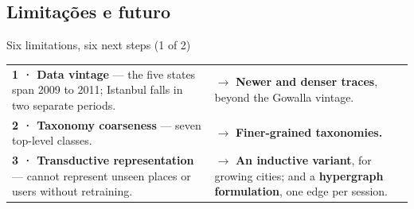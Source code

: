 \documentclass{beamer}
\begin{document}
\subsection{Limitações e futuro}

\begin{frame}{Six limitations, six next steps (1 of 2)}
    \vfill
    {\small
    \setlength{\tabcolsep}{6pt}
    \renewcommand{\arraystretch}{1.35}\begin{tabular}{@{}p{6.2cm} p{7.2cm}@{}}
        \toprule
        {\raggedright \textbf{1 · Data vintage} --- the five states span 2009 to 2011; Istanbul falls in two separate periods.\par}
            & {\raggedright $\rightarrow$ \textbf{Newer and denser traces}, beyond the Gowalla vintage.\par} \\
        \addlinespace
        {\raggedright \textbf{2 · Taxonomy coarseness} --- seven top-level classes.\par}
            & {\raggedright $\rightarrow$ \textbf{Finer-grained taxonomies.}\par} \\
        \addlinespace
        {\raggedright \textbf{3 · Transductive representation} --- \alert{cannot represent unseen places or users without retraining}.\par}
            & {\raggedright $\rightarrow$ \textbf{An inductive variant}, for growing cities; and a \textbf{hypergraph formulation}, one edge per session.\par} \\
        \bottomrule
    \end{tabular}
    \par}
    \vfill
\end{frame}
\end{document}
